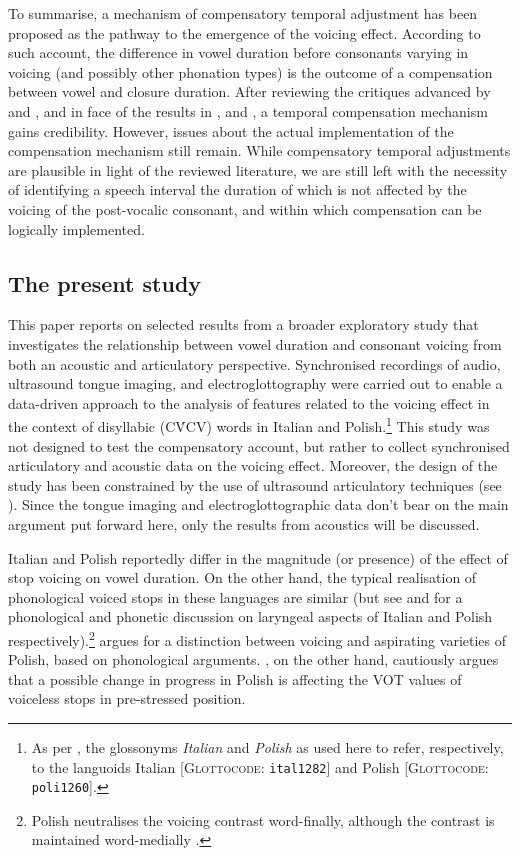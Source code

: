 \documentclass[charis]{glossa}
\begin{document}
To summarise, a mechanism of compensatory temporal adjustment has been
proposed as the pathway to the emergence of the voicing effect.
According to such account, the difference in vowel duration before
consonants varying in voicing (and possibly other phonation types) is
the outcome of a compensation between vowel and closure duration. After
reviewing the critiques advanced by \citet{chen1970} and
\citet{maddieson1976}, and in face of the results in \citet{slis1969},
\citet{de-jong1991} and \citet{begus2017}, a temporal compensation
mechanism gains credibility. However, issues about the actual
implementation of the compensation mechanism still remain. While
compensatory temporal adjustments are plausible in light of the reviewed
literature, we are still left with the necessity of identifying a speech
interval the duration of which is not affected by the voicing of the
post-vocalic consonant, and within which compensation can be logically
implemented.

\hypertarget{the-present-study}{%
\subsection{The present study}\label{the-present-study}}

This paper reports on selected results from a broader exploratory study
that investigates the relationship between vowel duration and consonant
voicing from both an acoustic and articulatory perspective. Synchronised
recordings of audio, ultrasound tongue imaging, and electroglottography
were carried out to enable a data-driven approach to the analysis of
features related to the voicing effect in the context of disyllabic
(CV́CV) words in Italian and
Polish.\footnote{As per \citet{cysouw2013}, the glossonyms \textit{Italian} and \textit{Polish} as used here to refer, respectively, to the languoids Italian [\textsc{Glottocode}: \texttt{ital1282}] and Polish [\textsc{Glottocode}: \texttt{poli1260}].}
This study was not designed to test the compensatory account, but rather
to collect synchronised articulatory and acoustic data on the voicing
effect. Moreover, the design of the study has been constrained by the
use of ultrasound articulatory techniques (see ). Since
the tongue imaging and electroglottographic data don't bear on the main
argument put forward here, only the results from acoustics will be
discussed.

Italian and Polish reportedly differ in the magnitude (or presence) of
the effect of stop voicing on vowel duration. On the other hand, the
typical realisation of phonological voiced stops in these languages are
similar (but see \citealt{huszthy2016} and \citealt{schwartz2018} for a
phonological and phonetic discussion on laryngeal aspects of Italian and
Polish
respectively).\footnote{Polish neutralises the voicing contrast word-finally, although the contrast is maintained word-medially \citep{strycharczuk2012a}.}
\citet{cyran2011} argues for a distinction between voicing and
aspirating varieties of Polish, based on phonological arguments.
\citet{waniek2011}, on the other hand, cautiously argues that a possible
change in progress in Polish is affecting the VOT values of voiceless
stops in pre-stressed position.
\end{document}
